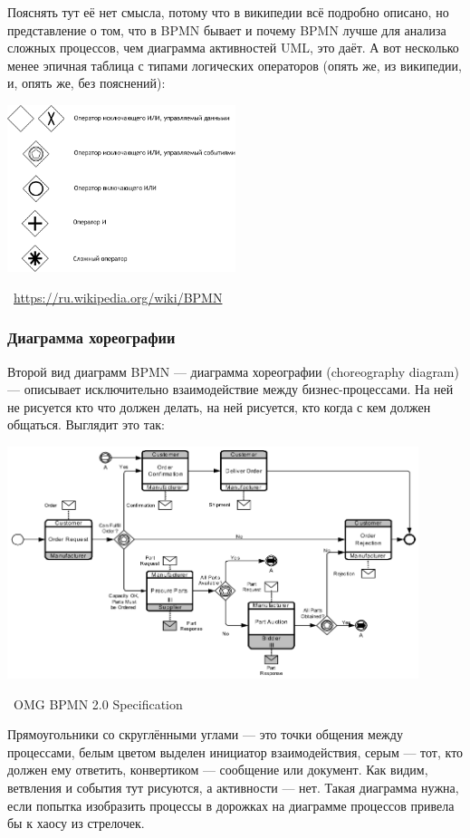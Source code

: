 \documentclass[a5paper]{article}
\newcommand{\attribution}[1] {
    \vspace{-4mm}\begin{flushright}\begin{scriptsize}%
    {\textcopyright\, #1}\end{scriptsize}\end{flushright}
}
\begin{document}
Пояснять тут её нет смысла, потому что в википедии всё подробно описано, но представление о том, что в BPMN бывает и почему BPMN лучше для анализа сложных процессов, чем диаграмма активностей UML, это даёт. А вот несколько менее эпичная таблица с типами логических операторов (опять же, из википедии, и, опять же, без пояснений):

\begin{center}
    \includegraphics[width=0.5\textwidth]{bpmnGateways.png}
    \attribution{\url{https://ru.wikipedia.org/wiki/BPMN}}
\end{center}

\subsubsection{Диаграмма хореографии}

Второй вид диаграмм BPMN --- диаграмма хореографии (choreography diagram) --- описывает исключительно взаимодействие между бизнес-процессами. На ней не рисуется кто что должен делать, на ней рисуется, кто когда с кем должен общаться. Выглядит это так:

\begin{center}
    \includegraphics[width=0.9\textwidth]{bpmnChoreography.png}
    \attribution{OMG BPMN 2.0 Specification}
\end{center}

Прямоугольники со скруглёнными углами --- это точки общения между процессами, белым цветом выделен инициатор взаимодействия, серым --- тот, кто должен ему ответить, конвертиком --- сообщение или документ. Как видим, ветвления и события тут рисуются, а активности --- нет. Такая диаграмма нужна, если попытка изобразить процессы в дорожках на диаграмме процессов привела бы к хаосу из стрелочек.
\end{document}

